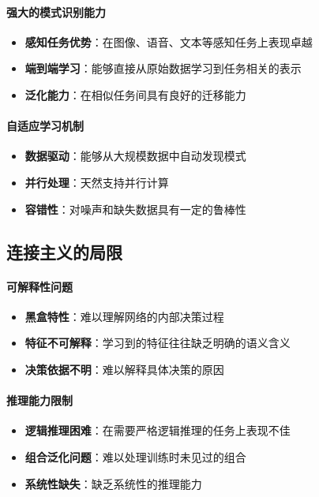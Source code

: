 \paragraph{强大的模式识别能力}
\begin{itemize}
\item \textbf{感知任务优势}：在图像、语音、文本等感知任务上表现卓越
\item \textbf{端到端学习}：能够直接从原始数据学习到任务相关的表示
\item \textbf{泛化能力}：在相似任务间具有良好的迁移能力
\end{itemize}

\paragraph{自适应学习机制}
\begin{itemize}
\item \textbf{数据驱动}：能够从大规模数据中自动发现模式
\item \textbf{并行处理}：天然支持并行计算
\item \textbf{容错性}：对噪声和缺失数据具有一定的鲁棒性
\end{itemize}

\subsection{连接主义的局限}

\paragraph{可解释性问题}
\begin{itemize}
\item \textbf{黑盒特性}：难以理解网络的内部决策过程
\item \textbf{特征不可解释}：学习到的特征往往缺乏明确的语义含义
\item \textbf{决策依据不明}：难以解释具体决策的原因
\end{itemize}

\paragraph{推理能力限制}
\begin{itemize}
\item \textbf{逻辑推理困难}：在需要严格逻辑推理的任务上表现不佳
\item \textbf{组合泛化问题}：难以处理训练时未见过的组合
\item \textbf{系统性缺失}：缺乏系统性的推理能力
\end{itemize}

